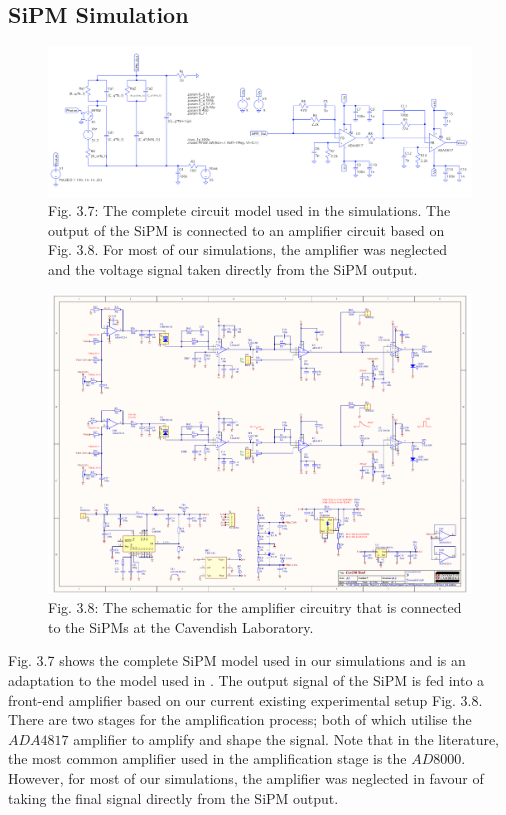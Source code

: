 \subsection{SiPM Simulation}

\begin{figure}[h]
  \centering
  \hfill\includegraphics[width=\linewidth]{Graphics/SiPM/SiPMSpice}\hspace*{\fill}
  {\caption*{Fig. 3.7: The complete circuit model used in the simulations. The output of the SiPM is connected to an amplifier circuit based on Fig. 3.8. For most of our simulations, the amplifier was neglected and the voltage signal taken directly from the SiPM output.}}
\end{figure}

\begin{figure}[h]
  \centering
  \hfill\includegraphics[width=\linewidth]{Graphics/SiPM/AmplifierCircuit}\hspace*{\fill}
  {\caption*{Fig. 3.8: The schematic for the amplifier circuitry that is connected to the SiPMs at the Cavendish Laboratory.}}
\end{figure}

Fig. 3.7 shows the complete SiPM model used in our simulations and is an adaptation to the model used in \cite{acerbi2019}. The output signal of the SiPM is fed into a front-end amplifier based on our current existing experimental setup Fig. 3.8. There are two stages for the amplification process; both of which utilise the $ADA4817$ amplifier \cite{ADA4817amp} to amplify and shape the signal. Note that in the literature, the most common amplifier used in the amplification stage is the $AD8000$. \cite{acerbi2019}\cite{seifert2010} However, for most of our simulations, the amplifier was neglected in favour of taking the final signal directly from the SiPM output.

